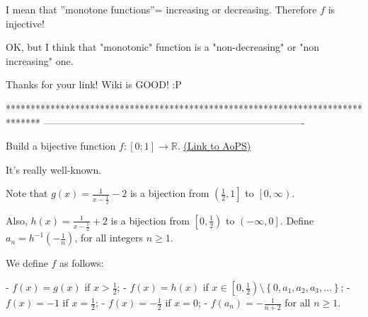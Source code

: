 \begin{mysolution}
	\begin{tcolorbox}I mean that ''monotone functions''= increasing or decreasing. Therefore $f$ is injective!\end{tcolorbox}

OK, but I think that "monotonic" function is a "non-decreasing" or "non increasing" one.

\end{mysolution}



\begin{mysolution}
	Thanks for your link! Wiki is GOOD!  :P
\end{mysolution}
*******************************************************************************
-------------------------------------------------------------------------------

\begin{problem}
	Build a bijective function $f: [0;1]\to \mathbb R$.
	\flushright \href{https://artofproblemsolving.com/community/c6h149198}{(Link to AoPS)}
\end{problem}



\begin{mysolution}
	It's really well-known.

Note that $g(x) = \frac1{x-\frac12}-2$ is a bijection from $\left( \frac12, 1 \right]$ to $\left[ 0, \infty \right)$.

Also, $h(x) = \frac1{x-\frac12}+2$ is a bijection from $\left[ 0, \frac12 \right)$ to $\left(-\infty, 0 \right]$. Define $a_{n}= h^{-1}\left(-\frac1{n}\right)$, for all integers $n \geq 1$.

We define $f$ as follows:

- $f(x) = g(x)$ if $x > \frac12$;
- $f(x) = h(x)$ if $x \in \left[ 0, \frac12 \right) \setminus \left\{ 0, a_{1}, a_{2}, a_{3}, \ldots \right\}$;
- $f(x) =-1$ if $x = \frac12$;
- $f(x) =-\frac12$ if $x = 0$;
- $f \left( a_{n}\right) =-\frac1{n+2}$ for all $n \geq 1$.
\end{mysolution}



